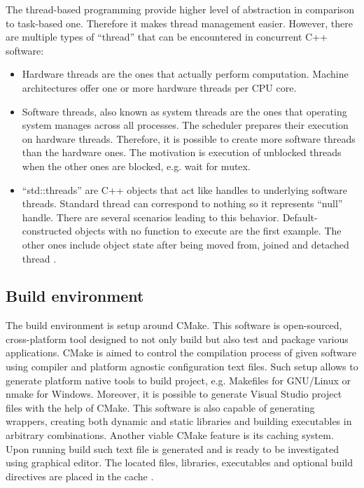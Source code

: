 The thread-based programming provide higher level of abstraction in comparison to task-based one.
Therefore it makes thread management easier. However, there are multiple types of ``thread''
that can be encountered in concurrent C++ software:
\begin{itemize}
    \item Hardware threads are the ones that actually perform computation. Machine architectures
    offer one or more hardware threads per CPU core.
    \item Software threads, also known as system threads are the ones that operating system manages
    across all processes. The scheduler prepares their execution on hardware threads. Therefore, it
    is possible to create more software threads than the hardware ones. The motivation is execution
    of unblocked threads when the other ones are blocked, e.g. wait for mutex.
    \item ``std::threads'' are C++ objects that act like handles to underlying software threads.
    Standard thread can correspond to nothing so it represents ``null'' handle. There are several scenarios
    leading to this behavior. Default-constructed objects with no function to execute are the first
    example. The other ones include object state after being moved from, joined and detached thread \cite{cpp_meyers}.
\end{itemize}

\subsection{Build environment}

The build environment is setup around CMake. This software is open-sourced, cross-platform tool
designed to not only build but also test and package various applications. CMake is aimed to
control the compilation process of given software using compiler and platform agnostic configuration
text files. Such setup allows to generate platform native tools to build project, e.g. Makefiles
for GNU/Linux or nmake for Windows. Moreover, it is possible to generate Visual Studio project
files with the help of CMake. This software is also capable of generating wrappers, creating
both dynamic and static libraries and building executables in arbitrary combinations. Another
viable CMake feature is its caching system. Upon running build such text file is generated
and is ready to be investigated using graphical editor. The located files, libraries, executables
and optional build directives are placed in the cache \cite{cmake}.

